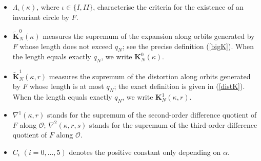 \documentclass{amsart}
\newcounter{item}[section]
\theoremstyle{definition}
\begin{document}
\begin{itemize}
	\item  \(\Lambda_\iota(\kappa)\), where \(\iota\in\{I,II\}\), characterise the criteria for the existence of an invariant circle by $F$.
	
	
	
	\item \(\widetilde{\mathbf{K}}_N^0(\kappa)\) measures the supremum of the expansion along orbits generated by \(F\) whose length does not exceed \(q_N\); see the precise definition (\ref{bigK}). When the length equals exactly \(q_N\), we write  \({\mathbf{K}}_N^0(\kappa)\).
	
	\item \(\widetilde{\mathbf{K}}_N^1(\kappa,r)\) measures the supremum of the distortion along orbits generated by \(F\) whose length is at most \(q_N\); the exact definition is given in (\ref{distK}). When the length equals exactly \(q_N\), we write \({\mathbf{K}}_N^1(\kappa,r)\).
	
	\item \(\nabla^1(\kappa,r)\) stands for the supremum of the second-order difference quotient of \(F\) along \(\mathcal{O}\); \(\nabla^2(\kappa,r,s)\) stands for the supremum of the third-order difference quotient of \(F\) along \(\mathcal{O}\).
	\item $C_i$ $(i=0,\ldots,5)$ denotes the positive constant only depending on $\alpha$.
\end{itemize}





\end{document}
